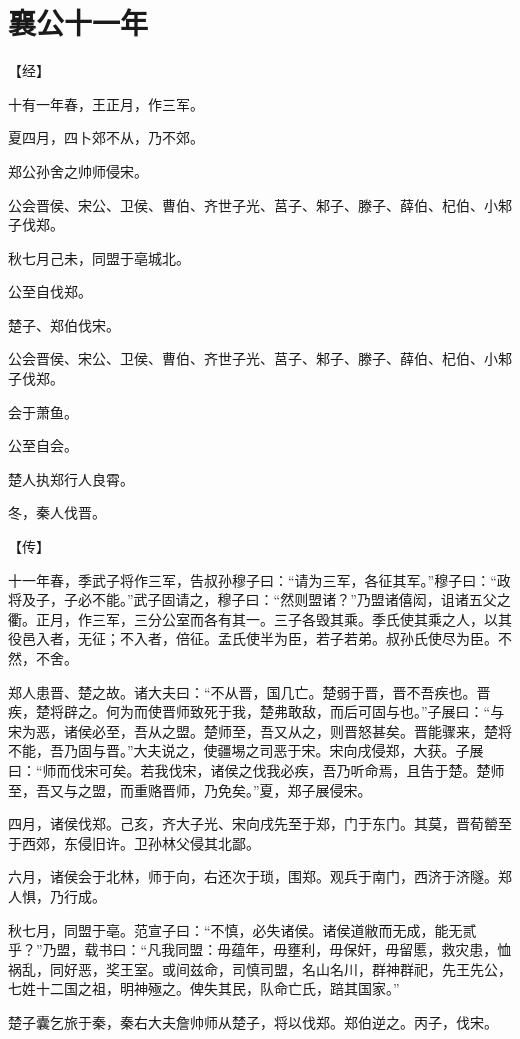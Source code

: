 \documentclass[a4paper,12pt,UTF8,twoside]{ctexbook}
\begin{document}
\section{襄公十一年}



【经】

十有一年春，王正月，作三军。

夏四月，四卜郊不从，乃不郊。

郑公孙舍之帅师侵宋。

公会晋侯、宋公、卫侯、曹伯、齐世子光、莒子、邾子、滕子、薛伯、杞伯、小邾子伐郑。

秋七月己未，同盟于亳城北。

公至自伐郑。

楚子、郑伯伐宋。

公会晋侯、宋公、卫侯、曹伯、齐世子光、莒子、邾子、滕子、薛伯、杞伯、小邾子伐郑。

会于萧鱼。

公至自会。

楚人执郑行人良霄。

冬，秦人伐晋。

【传】

十一年春，季武子将作三军，告叔孙穆子曰：“请为三军，各征其军。”穆子曰：“政将及子，子必不能。”武子固请之，穆子曰：“然则盟诸？”乃盟诸僖闳，诅诸五父之衢。正月，作三军，三分公室而各有其一。三子各毁其乘。季氏使其乘之人，以其役邑入者，无征；不入者，倍征。孟氏使半为臣，若子若弟。叔孙氏使尽为臣。不然，不舍。

郑人患晋、楚之故。诸大夫曰：“不从晋，国几亡。楚弱于晋，晋不吾疾也。晋疾，楚将辟之。何为而使晋师致死于我，楚弗敢敌，而后可固与也。”子展曰：“与宋为恶，诸侯必至，吾从之盟。楚师至，吾又从之，则晋怒甚矣。晋能骤来，楚将不能，吾乃固与晋。”大夫说之，使疆埸之司恶于宋。宋向戌侵郑，大获。子展曰：“师而伐宋可矣。若我伐宋，诸侯之伐我必疾，吾乃听命焉，且告于楚。楚师至，吾又与之盟，而重赂晋师，乃免矣。”夏，郑子展侵宋。

四月，诸侯伐郑。己亥，齐大子光、宋向戌先至于郑，门于东门。其莫，晋荀罃至于西郊，东侵旧许。卫孙林父侵其北鄙。

六月，诸侯会于北林，师于向，右还次于琐，围郑。观兵于南门，西济于济隧。郑人惧，乃行成。

秋七月，同盟于亳。范宣子曰：“不慎，必失诸侯。诸侯道敝而无成，能无贰乎？”乃盟，载书曰：“凡我同盟：毋蕴年，毋壅利，毋保奸，毋留慝，救灾患，恤祸乱，同好恶，奖王室。或间兹命，司慎司盟，名山名川，群神群祀，先王先公，七姓十二国之祖，明神殛之。俾失其民，队命亡氏，踣其国家。”

楚子囊乞旅于秦，秦右大夫詹帅师从楚子，将以伐郑。郑伯逆之。丙子，伐宋。
\end{document}
